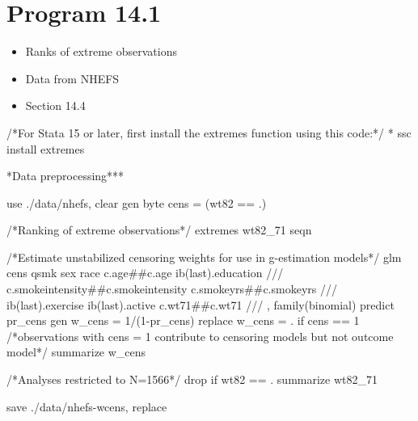 \documentclass[
  10pt,
  a4paper,
]{book}
\newenvironment{Shaded}{\begin{snugshade}}{\end{snugshade}}
\newcommand{\CommentTok}[1]{\textcolor[rgb]{0.37,0.37,0.37}{#1}}
\newcommand{\FunctionTok}[1]{\textcolor[rgb]{0.28,0.35,0.67}{#1}}
\newcommand{\KeywordTok}[1]{\textcolor[rgb]{0.00,0.46,0.62}{#1}}
\newcommand{\NormalTok}[1]{\textcolor[rgb]{0.00,0.46,0.62}{#1}}
\providecommand{\tightlist}{%
  \setlength{\itemsep}{0pt}\setlength{\parskip}{0pt}}
\begin{document}
\section{Program 14.1}\label{program-14.1-1}

\begin{itemize}
\tightlist
\item
  Ranks of extreme observations
\item
  Data from NHEFS
\item
  Section 14.4
\end{itemize}

\begin{Shaded}
\begin{Highlighting}[]
\CommentTok{/*For Stata 15 or later, first install the extremes function using this code:*/}
\NormalTok{* }\KeywordTok{ssc}\NormalTok{ install extremes }

\NormalTok{*Data preprocessing***}

\KeywordTok{use}\NormalTok{ ./}\KeywordTok{data}\NormalTok{/nhefs, }\KeywordTok{clear}
\KeywordTok{gen} \KeywordTok{byte}\NormalTok{ cens = (wt82 == .)}

\CommentTok{/*Ranking of extreme observations*/}
\NormalTok{extremes wt82\_71 seqn}

\CommentTok{/*Estimate unstabilized censoring weights for use in g{-}estimation models*/}
\KeywordTok{glm}\NormalTok{ cens qsmk sex race c.age\#\#c.age ib(}\FunctionTok{last}\NormalTok{).education }\CommentTok{///}
\NormalTok{  c.smokeintensity\#\#c.smokeintensity c.smokeyrs\#\#c.smokeyrs }\CommentTok{///}
\NormalTok{  ib(}\FunctionTok{last}\NormalTok{).exercise ib(}\FunctionTok{last}\NormalTok{).active c.wt71\#\#c.wt71 }\CommentTok{///}
\NormalTok{  , }\KeywordTok{family}\NormalTok{(binomial)}
\KeywordTok{predict}\NormalTok{ pr\_cens}
\KeywordTok{gen}\NormalTok{ w\_cens = 1/(1{-}pr\_cens)}
\KeywordTok{replace}\NormalTok{ w\_cens = . }\KeywordTok{if}\NormalTok{ cens == 1 }
\CommentTok{/*observations with cens = 1 contribute to censoring models but not outcome model*/}
\KeywordTok{summarize}\NormalTok{ w\_cens}

\CommentTok{/*Analyses restricted to N=1566*/}
\KeywordTok{drop} \KeywordTok{if}\NormalTok{ wt82 == .}
\KeywordTok{summarize}\NormalTok{ wt82\_71}

\KeywordTok{save}\NormalTok{ ./}\KeywordTok{data}\NormalTok{/nhefs{-}wcens, }\KeywordTok{replace}
\end{Highlighting}
\end{Shaded}
\end{document}
